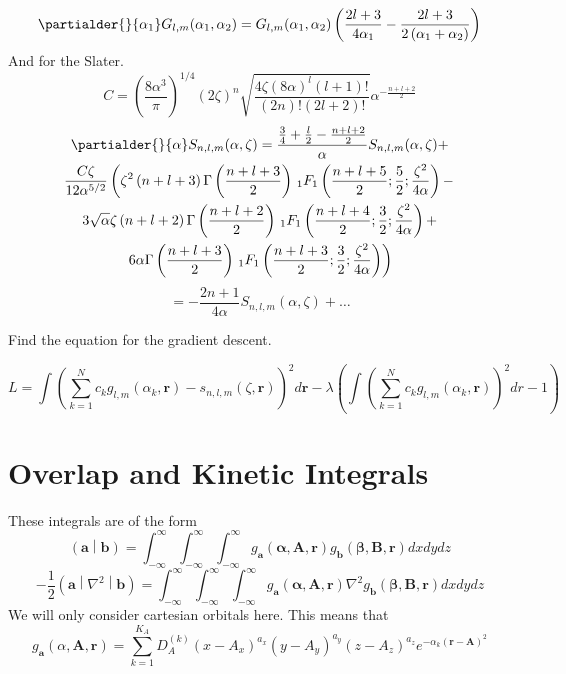 \documentclass[12pt]{article}
\begin{document}
$$\partialder{}{\alpha_1} G_{l,m}(\alpha_1, \alpha_2) = G_{l,m}(\alpha_1, \alpha_2) \left(\frac{2l + 3}{4\alpha_1} - \frac{2l + 3}{2\left(\alpha_1 + \alpha_2\right)}\right)$$
And for the Slater.
$$C = \left(\frac{8\alpha^3}{\pi}\right)^{1/4}(2\zeta)^n\sqrt{\frac{4\zeta (8\alpha)^l(l +1)!}{(2n)! (2l + 2)!}} \alpha^{-\frac{n + l + 2}{2}}$$
\begin{multline*}
  \partialder{}{\alpha} S_{n,l,m}(\alpha, \zeta) = \frac{\frac{3}{4} + \frac{l}{2} - \frac{n + l + 2}{2}}{\alpha}S_{n,l,m}(\alpha,\zeta) + \\
  \frac{C\zeta}{12\alpha^{5/2}}\left(\zeta^2\left(n + l + 3\right)\Gamma\left(\frac{n + l + 3}{2}\right)\, _1F_1\left(\frac{n + l + 5}{2}; \frac{5}{2}; \frac{\zeta^2}{4\alpha}\right) - \right.\\
  3\sqrt{\alpha}\zeta\left(n + l + 2\right)\Gamma\left(\frac{n + l + 2}{2}\right)\,_1F_1\left(\frac{n + l + 4}{2}; \frac{3}{2}; \frac{\zeta^2}{4\alpha}\right) +\\
  \left.6\alpha\Gamma\left(\frac{n + l + 3}{2}\right)\,_1F_1\left(\frac{n + l + 3}{2}; \frac{3}{2}; \frac{\zeta^2}{4\alpha}\right)\right)
\end{multline*}
$$= -\frac{2n + 1}{4\alpha}S_{n,l,m}(\alpha,\zeta) + \ldots$$

  
  
Find the equation for the gradient descent.

$$L = \int \left(\sum_{k=1}^N c_k g_{l,m}(\alpha_k,\mathbf{r}) - s_{n,l,m}(\zeta,\mathbf{r})\right)^2 d\mathbf{r} - \lambda \left(\int \left(\sum_{k=1}^N c_k g_{l,m}(\alpha_k, \mathbf{r})\right)^2 dr - 1\right)$$

\section*{Overlap and Kinetic Integrals}

These integrals are of the form
$$\left(\mathbf{a}\middle|\mathbf{b}\right) = \int_{-\infty}^\infty\int_{-\infty}^\infty\int_{-\infty}^\infty g_{\mathbf{a}}\left(\mathbf{\alpha}, \mathbf{A}, \mathbf{r}\right)g_{\mathbf{b}}\left(\mathbf{\beta}, \mathbf{B}, \mathbf{r}\right) dxdydz$$
$$-\frac{1}{2}\left(\mathbf{a}\middle|\nabla^2\middle|\mathbf{b}\right) = \int_{-\infty}^\infty\int_{-\infty}^\infty\int_{-\infty}^\infty g_{\mathbf{a}}\left(\mathbf{\alpha}, \mathbf{A}, \mathbf{r}\right)\nabla^2 g_{\mathbf{b}}\left(\mathbf{\beta}, \mathbf{B}, \mathbf{r}\right) dxdydz$$
We will only consider cartesian orbitals here. This means that
$$g_{\mathbf{a}}\left(\alpha, \mathbf{A}, \mathbf{r}\right) = \sum_{k = 1}^{K_A} D_{A}^{(k)} \left(x - A_x\right)^{a_x}\left(y - A_y\right)^{a_y}\left(z - A_z\right)^{a_z}e^{-\alpha_k \left(\mathbf{r} - \mathbf{A}\right)^2}$$
\end{document}

